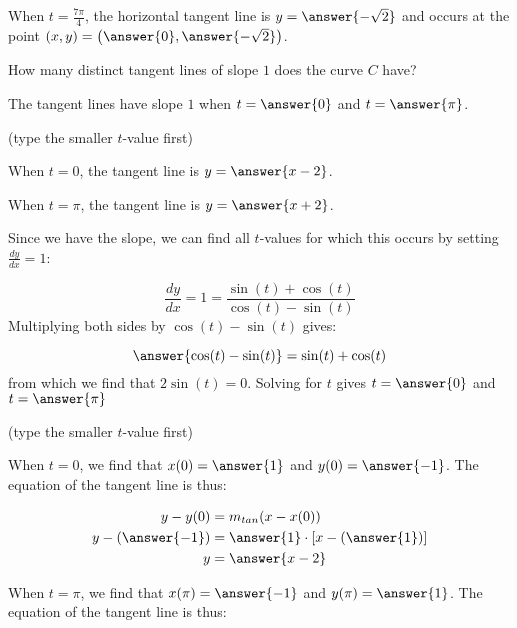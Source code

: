 \documentclass{ximera}
\begin{document}
\begin{exercise}
\begin{exercise}
\begin{exercise}
When $t=\frac{7\pi}{4}$, the horizontal tangent line is $y=\answer{-\sqrt{2}}$ and occurs at the point $(x,y) = \left(\answer{0},\answer{-\sqrt{2}}\right)$.
\end{exercise}
\end{exercise}

\begin{exercise}

How many distinct tangent lines of slope $1$ does the curve $C$ have?
\begin{multipleChoice}
\end{multipleChoice} 

The tangent lines have slope $1$ when $t= \answer{0}$ and $t=\answer{\pi}$.

(type the smaller $t$-value first)

\begin{exercise}
When $t=0$, the tangent line is $y=\answer{x-2}$.

When $t=\pi$, the tangent line is $y=\answer{x+2}$.
\end{exercise}
 
\begin{hint}
Since we have the slope, we can find all $t$-values for which this occurs by setting $\frac{dy}{dx} = 1$:

\[
\frac{dy}{dx} = 1 = \frac{\sin(t)+\cos(t)}{\cos(t)-\sin(t)}
\]
Multiplying both sides by $\cos(t)-\sin(t)$ gives:

\[
\answer{\cos(t)-\sin(t)} =\sin(t)+\cos(t)
\]
from which we find that $2\sin(t)=0$.  Solving for $t$ gives $t=\answer{0}$ and $t=\answer{\pi}$

(type the smaller $t$-value first)

\begin{question}
When $t=0$, we find that $x(0) = \answer{1}$ and $y(0) = \answer{-1}$.  The equation of the tangent line is thus:

\begin{align*}
y-y(0) &= m_{tan}(x-x(0)) \\
y-\left(\answer{-1}\right) &= \answer{1} \cdot \left[x- \left(\answer{1}\right) \right]\\
y&= \answer{x-2}
\end{align*}

\end{question}

\begin{question}
When $t=\pi$, we find that $x(\pi) = \answer{-1}$ and $y(\pi) = \answer{1}$.  The equation of the tangent line is thus:


\end{question}
\end{hint}
\end{exercise}
\end{exercise}
\end{document}
